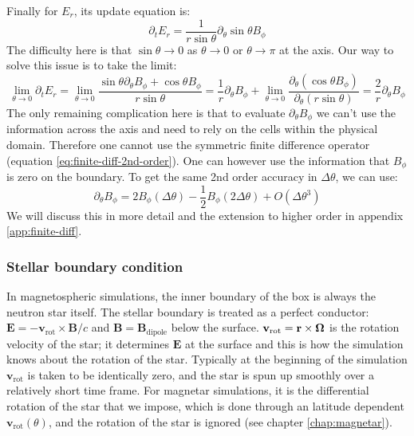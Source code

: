 Finally for $E_{r}$, its update equation is:
\begin{equation}
  \label{eq:Er-update}
  \partial_tE_r = \frac{1}{r\sin\theta}\partial_{\theta}\sin\theta B_{\phi}
\end{equation}
The difficulty here is that $\sin\theta \to 0$ as $\theta\to 0$ or
$\theta\to\pi$ at the axis. Our way to solve this issue is to take the limit:
\begin{equation}
  \label{eq:biot-savart}
  \lim_{\theta\to 0}\partial_tE_r = \lim_{\theta \to 0}\frac{\sin\theta\partial_{\theta} B_{\phi} + \cos\theta B_{\phi}}{r\sin\theta} = \frac{1}{r}\partial_{\theta}B_{\phi} + \lim_{\theta\to 0}\frac{\partial_{\theta}(\cos\theta B_{\phi})}{\partial_{\theta}(r\sin\theta)} = \frac{2}{r}\partial_{\theta}B_{\phi}
\end{equation}
The only remaining complication here is that to evaluate
$\partial_{\theta}B_{\phi}$ we can't use the information across the axis and
need to rely on the cells within the physical domain. Therefore one cannot use
the symmetric finite difference operator (equation
\eqref{eq:finite-diff-2nd-order}). One can however use the information that
$B_{\phi}$ is zero on the boundary. To get the same 2nd order accuracy in
$\Delta \theta$, we can use:
\begin{equation}
  \label{eq:one-sided-2nd-order}
  \partial_\theta B_{\phi} = 2B_{\phi}(\Delta\theta) - \frac{1}{2}B_{\phi}(2\Delta \theta) + O(\Delta \theta^{3})
\end{equation}
We will discuss this in more detail and the extension to higher order in
appendix \ref{app:finite-diff}.

\subsubsection{Stellar boundary condition}
\label{sec:stellar-bc}

In magnetospheric simulations, the inner boundary of the box is always the
neutron star itself. The stellar boundary is treated as a perfect conductor:
$\mathbf{E} = -\mathbf{v}_\mathrm{rot}\times \mathbf{B}/c$ and $\mathbf{B} =
\mathbf{B}_\mathrm{dipole}$ below the surface. $\mathbf{v}_\mathrm{rot} =
\mathbf{r}\times \bm{\Omega}$ is the rotation velocity of the star; it determines
$\mathbf{E}$ at the surface and this is how the simulation knows about the
rotation of the star. Typically at the beginning of the simulation
$\mathbf{v}_\mathrm{rot}$ is taken to be identically zero, and the star is spun
up smoothly over a relatively short time frame. For magnetar simulations, it is
the differential rotation of the star that we impose, which is done through an
latitude dependent $\mathbf{v}_\mathrm{rot}(\theta)$, and the rotation of the star
is ignored (see chapter \ref{chap:magnetar}).

